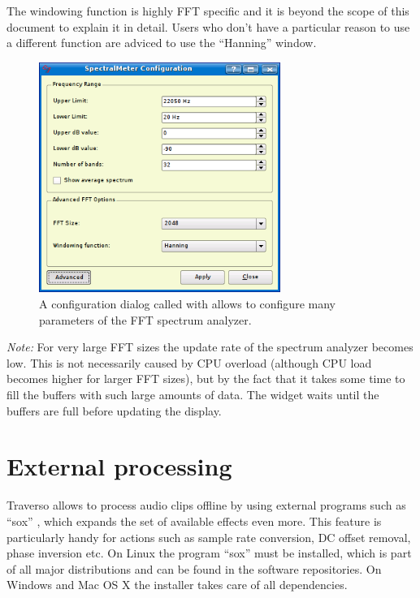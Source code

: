 The windowing function is highly FFT specific and it is beyond the scope of this document to explain it in detail. Users who don't have a particular reason to use a different function are adviced to use the ``Hanning'' window.

\begin{figure}
	\centering
	\includegraphics[width=0.7\textwidth]{../images/fft3}
	\caption{A configuration dialog called with  allows to configure many parameters of the FFT spectrum analyzer.}
	\label{fig_fft3}
\end{figure}

\emph{Note:} For very large FFT sizes the update rate of the spectrum analyzer becomes low. This is not necessarily caused by CPU overload (although CPU load becomes higher for larger FFT sizes), but by the fact that it takes some time to fill the buffers with such large amounts of data. The widget waits until the buffers are full before updating the display.

\section{External processing}
Traverso allows to process audio clips offline by using external programs such as ``sox'' \cite{sox}, which expands the set of available effects even more. This feature is particularly handy for actions such as sample rate conversion, DC offset removal, phase inversion etc. On Linux the program ``sox'' must be installed, which is part of all major distributions and can be found in the software repositories. On Windows and Mac OS X the installer takes care of all dependencies.

